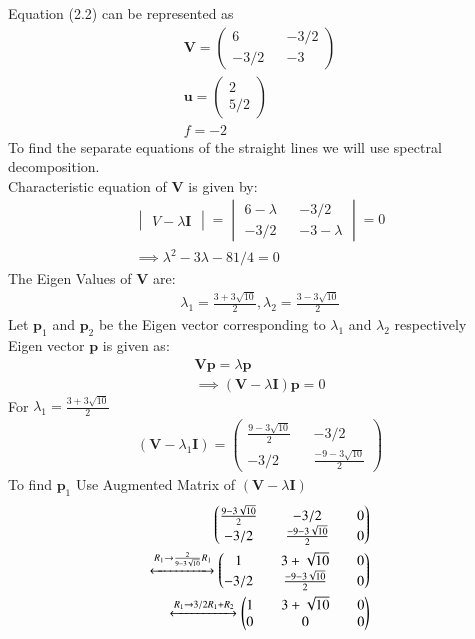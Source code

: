 \documentclass[journal,13pt,twocolumn]{IEEEtran}
\newcommand{\myvec}[1]{\ensuremath{\begin{pmatrix}#1\end{pmatrix}}}
\newcommand{\mydet}[1]{\ensuremath{\begin{vmatrix}#1\end{vmatrix}}}
\renewcommand{\vec}[1]{\mathbf{#1}}
\begin{document}
Equation (2.2) can be represented as 
\begin{equation}
\begin{split}
\vec{V}=\myvec{6 && -3/2\\ -3/2 && -3}\\
\vec{u}=\myvec{2\\5/2}\\
f= -2
\end{split}
\end{equation}
To find the separate equations of the straight lines we will use spectral decomposition.\\
Characteristic equation of $\vec{V}$ is given by:
\begin{equation}
\begin{split}
\mydet{V-\lambda \vec{I}}=\mydet{6-\lambda && -3/2\\ -3/2 && -3-\lambda} = 0\\
\implies \lambda^2 - 3\lambda - 81/4 = 0
\end{split}
\end{equation}
The Eigen Values of $\vec{V}$ are:
\begin{align}
\lambda_1 = \frac{3+3\sqrt{10}}{2}, \lambda_2 = \frac{3-3\sqrt{10}}{2}
\end{align}
Let $\vec{p}_1$ and $\vec{p}_2$ be the Eigen vector corresponding to $\lambda_1$ and $\lambda_2$ respectively\\
Eigen vector $\vec{p}$ is given as:
\begin{equation} 
\begin{split}
\vec{V}\vec{p} = \lambda\vec{p}\\
\implies (\vec{V} - \lambda \vec{I})\vec{p} = 0
\end{split}
\end{equation}
For $\lambda_1 = \frac{3+3\sqrt{10}}{2}$
\begin{align}
(\vec{V} - \lambda_1 \vec{I}) = \myvec{\frac{9-3\sqrt{10}}{2} && -3/2\\ -3/2 && \frac{-9-3\sqrt{10}}{2}}
\end{align}
To find $ \vec{p}_1 $ Use Augmented Matrix of $(\vec{V} - \lambda \vec{I})$
\begin{equation}
\begin{split}
 \myvec{\frac{9-3\sqrt{10}}{2} && -3/2 && 0\\ -3/2 && \frac{-9-3\sqrt{10}}{2} && 0}\\
\xleftrightarrow[]{R_1\rightarrow \frac{2}{9-3\sqrt{10}}R_1} 
\myvec{1 && 3+\sqrt{10} && 0\\ -3/2 && \frac{-9-3\sqrt{10}}{2} && 0}\\
\xleftrightarrow[]{R_1\rightarrow 3/2R_1+R_2} 
\myvec{1 && 3+\sqrt{10} && 0\\ 0 && 0 && 0} 
\end{split}
\end{equation}
\end{document}
